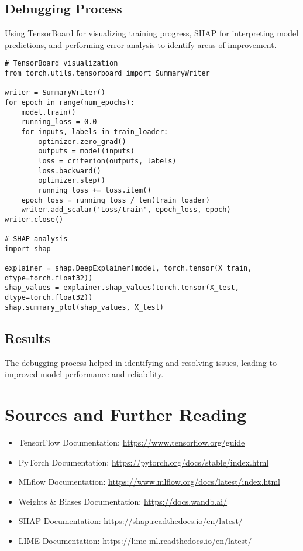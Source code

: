 \subsection{Debugging Process}
Using TensorBoard for visualizing training progress, SHAP for interpreting model predictions, and performing error analysis to identify areas of improvement.

\begin{verbatim}
# TensorBoard visualization
from torch.utils.tensorboard import SummaryWriter

writer = SummaryWriter()
for epoch in range(num_epochs):
    model.train()
    running_loss = 0.0
    for inputs, labels in train_loader:
        optimizer.zero_grad()
        outputs = model(inputs)
        loss = criterion(outputs, labels)
        loss.backward()
        optimizer.step()
        running_loss += loss.item()
    epoch_loss = running_loss / len(train_loader)
    writer.add_scalar('Loss/train', epoch_loss, epoch)
writer.close()

# SHAP analysis
import shap

explainer = shap.DeepExplainer(model, torch.tensor(X_train, dtype=torch.float32))
shap_values = explainer.shap_values(torch.tensor(X_test, dtype=torch.float32))
shap.summary_plot(shap_values, X_test)
\end{verbatim}

\subsection{Results}
The debugging process helped in identifying and resolving issues, leading to improved model performance and reliability.

\section{Sources and Further Reading}
\begin{itemize}
    \item TensorFlow Documentation: \url{https://www.tensorflow.org/guide}
    \item PyTorch Documentation: \url{https://pytorch.org/docs/stable/index.html}
    \item MLflow Documentation: \url{https://www.mlflow.org/docs/latest/index.html}
    \item Weights & Biases Documentation: \url{https://docs.wandb.ai/}
    \item SHAP Documentation: \url{https://shap.readthedocs.io/en/latest/}
    \item LIME Documentation: \url{https://lime-ml.readthedocs.io/en/latest/}
\end{itemize}

